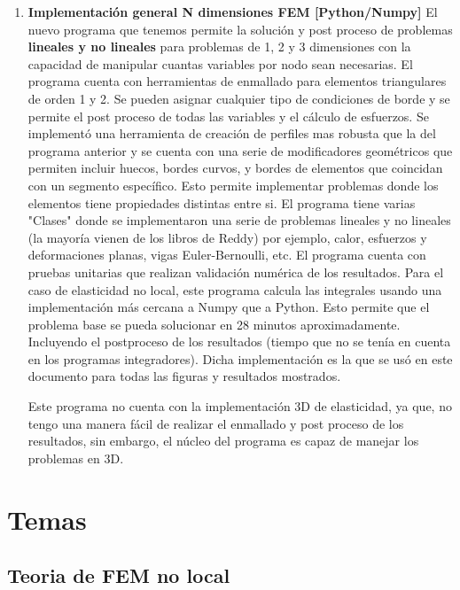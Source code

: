 \documentclass{article}
\begin{document}
\begin{enumerate}
    \item \textbf{Implementación general N dimensiones FEM [Python/Numpy]}
        El nuevo programa que tenemos permite la solución y post proceso de problemas \textbf{lineales y no lineales} para problemas de 1, 2 y 3 dimensiones con la capacidad de manipular cuantas variables por nodo sean necesarias. El programa cuenta con herramientas de enmallado para elementos triangulares de orden 1 y 2. Se pueden asignar cualquier tipo de condiciones de borde y se permite el post proceso de todas las variables y el cálculo de esfuerzos. Se implementó una herramienta de creación de perfiles mas robusta que la del programa anterior y se cuenta con una serie de modificadores geométricos que permiten incluir huecos, bordes curvos, y bordes de elementos que coincidan con un segmento específico. Esto permite implementar problemas donde los elementos tiene propiedades distintas entre si. El programa tiene varias "Clases" donde se implementaron una serie de problemas lineales y no lineales (la mayoría vienen de los libros de Reddy) por ejemplo, calor, esfuerzos y deformaciones planas, vigas Euler-Bernoulli, etc. El programa cuenta con pruebas unitarias que realizan validación numérica de los resultados. Para el caso de elasticidad no local, este programa calcula las integrales usando una implementación más cercana a Numpy que a Python. Esto permite que el problema base se pueda solucionar en 28 minutos aproximadamente. Incluyendo el postproceso de los resultados (tiempo que no se tenía en cuenta en los programas integradores). Dicha implementación es la que se usó en este documento para todas las figuras y resultados mostrados.

        Este programa no cuenta con la implementación 3D de elasticidad, ya que, no tengo una manera fácil de realizar el enmallado y post proceso de los resultados, sin embargo, el núcleo del programa es capaz de manejar los problemas en 3D.

\end{enumerate}

\section*{Temas}

\subsection*{Teoria de FEM no local}
\end{document}

